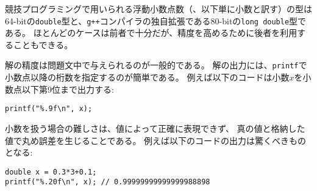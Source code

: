 

\begin{comment}
The usual floating point types in
competitive programming are
the 64-bit \texttt{double}
and, as an extension in the \texttt{g++} compiler,
the 80-bit \texttt{long double}.
In most cases, \texttt{double} is enough,
but \texttt{long double} is more accurate.

The required precision of the answer
is usually given in the problem statement.
An easy way to output the answer is to use
the \texttt{printf} function
and give the number of decimal places
in the formatting string.
For example, the following code prints
the value of $x$ with 9 decimal places:
\end{comment}

競技プログラミングで用いられる浮動小数点数（、以下単に小数と訳す）の型は
64-bitの\texttt{double}型と、\texttt{g++}コンパイラの独自拡張である80-bitの\texttt{long double}型である。
ほとんどのケースは前者で十分だが、精度を高めるために後者を利用することもできる。

解の精度は問題文中で与えられるのが一般的である。
解の出力には、\texttt{printf}で小数点以降の桁数を指定するのが簡単である。
例えば以下のコードは小数$x$を小数点以下第9位まで出力する:

\begin{lstlisting}
printf("%.9f\n", x);
\end{lstlisting}

\begin{comment}
A difficulty when using floating point numbers
is that some numbers cannot be represented
accurately as floating point numbers,
and there will be rounding errors.
For example, the result of the following code
is surprising:
\end{comment}

小数を扱う場合の難しさは、値によって正確に表現できず、
真の値と格納した値で丸め誤差を生じることである。
例えば以下のコードの出力は驚くべきものとなる:

\begin{lstlisting}
double x = 0.3*3+0.1;
printf("%.20f\n", x); // 0.99999999999999988898
\end{lstlisting}

\begin{comment}
Due to a rounding error,
the value of \texttt{x} is a bit smaller than 1,
while the correct value would be 1.

It is risky to compare floating point numbers
with the \texttt{==} operator,
because it is possible that the values should be
equal but they are not because of precision errors.
A better way to compare floating point numbers
is to assume that two numbers are equal
if the difference between them is less than $\varepsilon$,
where $\varepsilon$ is a small number.
\end{comment}

